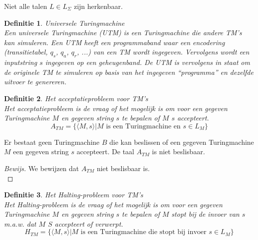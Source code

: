 \documentclass[a4paper]{article}
\newtheorem{tdefinitie}{Definitie}[section]
\newenvironment{definitie}[1]%
  {\begin{mdframed}[backgroundcolor=silver,
    topline=false,
    rightline=false,
    leftline=false,
    bottomline=false]\begin{tdefinitie}#1\\\normalfont}%
  {\end{tdefinitie}\end{mdframed}}
\newenvironment{bewijs}[1]%
  {\begin{mdframed}[topline=true,
    rightline=true,
    leftline=true,
    bottomline=true]\begin{proof}[Bewijs]#1\\[.2cm]\normalfont}%
  {\end{proof}\end{mdframed}}
\newcommand{\atm}{\ensuremath{{A_{TM}}}}
\newcommand{\htm}{\ensuremath{{H_{TM}}}}
\begin{document}
Niet alle talen $L \in L_\Sigma$ zijn herkenbaar.


\begin{definitie}{Universele Turingmachine}
  \label{def:utm}
  Een universele Turingmachine (UTM) is een Turingmachine die andere TM's kan simuleren. Een UTM heeft een programmaband waar een encodering (transitietabel, $q_s$, $q_a$, $q_r$, ...) van een TM wordt ingegeven. Vervolgens wordt een inputstring $s$ ingegeven op een geheugenband. De UTM is vervolgens in staat om de originele TM te simuleren op basis van het ingegeven ``programma'' en dezelfde uitvoer te genereren.
\end{definitie}

\begin{definitie}{Het acceptatieprobleem voor TM's}
  Het acceptatieprobleem is de vraag of het mogelijk is om voor een gegeven Turingmachine $M$ en gegeven string $s$ te bepalen of $M$ $s$ accepteert.
  \begin{equation*}
  \atm = \{\langle M,s \rangle | M\text{ is een Turingmachine en }s \in L_M\}
  \end{equation*}
\end{definitie}

Er bestaat geen Turingmachine $B$ die kan beslissen of een gegeven Turingmachine $M$ een gegeven string $s$ accepteert. De taal $\atm$ is niet beslisbaar.

\begin{bewijs}{We bewijzen dat $\atm$ niet beslisbaar is.}
  
\end{bewijs}

\begin{definitie}{Het Halting-probleem voor TM's}
  \label{def:htm}
  Het Halting-probleem is de vraag of het mogelijk is om voor een gegeven Turingmachine $M$ en gegeven string $s$ te bepalen of $M$ stopt bij de invoer van $s$ m.a.w. dat $M$ $S$ accepteert of verwerpt.
  \begin{equation*}
  \htm = \{\langle M,s \rangle | M\text{ is een Turingmachine die stopt bij invoer }s \in L_M\}
  \end{equation*}
\end{definitie}
\end{document}
